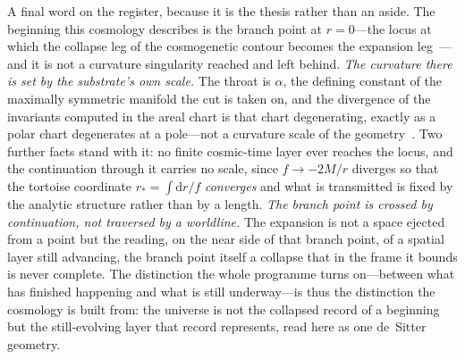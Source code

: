 \documentclass[11pt,a4paper]{article}
\theoremstyle{plain}
\theoremstyle{definition}
\theoremstyle{remark}
\newcommand{\dd}{\mathrm{d}}   %
\begin{document}
A final word on the register, because it is the thesis rather than an aside. The beginning this cosmology describes is the branch point at $r=0$---the locus at which the collapse leg of
the cosmogenetic contour becomes the expansion leg~\cite{JanzenCRframework}---and it is not a curvature
singularity reached and left behind. \emph{The curvature there is set by the substrate's own scale.} The
throat is $\alpha$, the defining constant of the maximally symmetric manifold the cut is taken on, and the
divergence of the invariants computed in the areal chart is that chart degenerating, exactly as a polar chart
degenerates at a pole---not a curvature scale of the geometry~\cite{JanzenCosmogenesis, JanzenGeometricCore}.
Two further facts stand with it: no finite cosmic-time layer ever reaches the locus, and the continuation
through it carries no scale, since $f\to-2M/r$ diverges so that the tortoise coordinate
$r_{*}=\int\dd r/f$ \emph{converges} and what is transmitted is fixed by the analytic structure rather than by
a length. \emph{The branch point is crossed by continuation, not traversed by a worldline.} The expansion is not a space ejected from a point but the reading, on the near side of that branch point, of a spatial layer still advancing, the branch point itself a collapse that in the frame it bounds is never complete. The distinction the whole programme turns on---between what has finished happening and what is still underway---is thus the distinction the cosmology is built from: the universe is not the collapsed record of a beginning but the still-evolving layer that record represents, read here as one de~Sitter geometry.


\end{document}

